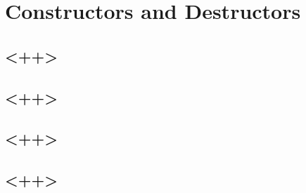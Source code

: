 \chapter{Constructors and Destructors}

\section{<++>}

\section{<++>}

\section{<++>}

\section{<++>}

